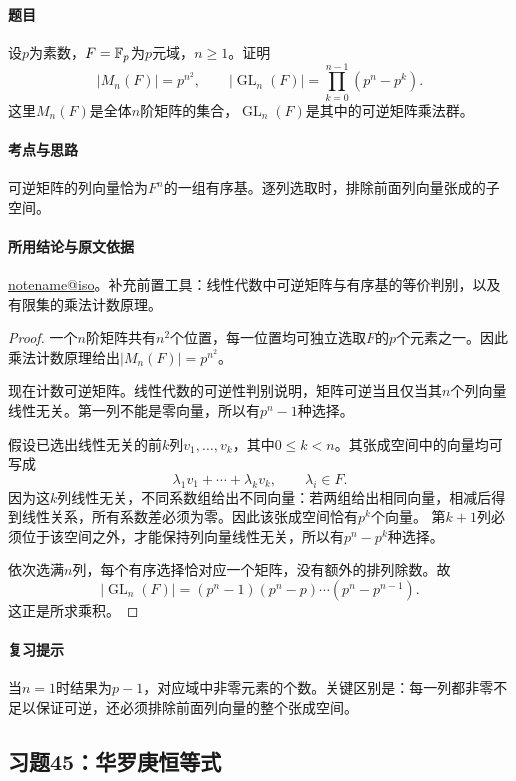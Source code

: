 \documentclass[UTF8,a4paper,11pt,fontset=windows]{ctexart}
\makeatletter
\DeclareMathOperator{\GL}{GL}\DeclareMathOperator{\SL}{SL}
\newcommand{\noteref}[1]{\hyperref[note:#1]{\csname notename@#1\endcsname}}
\newcommand{\exref}[2]{\hyperref[ex:#1:#2]{第#1章习题#2}}
\makeatother
\begin{document}
\paragraph{题目}
设$p$为素数，$F=\mathbb F_p$为$p$元域，$n\geq1$。证明
\[
|M_n(F)|=p^{n^2},\qquad
|\GL_n(F)|=\prod_{k=0}^{n-1}(p^n-p^k).
\]
这里$M_n(F)$是全体$n$阶矩阵的集合，$\GL_n(F)$是其中的可逆矩阵乘法群。

\paragraph{考点与思路}
可逆矩阵的列向量恰为$F^n$的一组有序基。逐列选取时，排除前面列向量张成的子空间。

\paragraph{所用结论与原文依据}
\noteref{iso}。补充前置工具：线性代数中可逆矩阵与有序基的等价判别，以及有限集的乘法计数原理。


\begin{proof}
一个$n$阶矩阵共有$n^2$个位置，每一位置均可独立选取$F$的$p$个元素之一。因此乘法计数原理给出$|M_n(F)|=p^{n^2}$。

现在计数可逆矩阵。线性代数的可逆性判别说明，矩阵可逆当且仅当其$n$个列向量线性无关。第一列不能是零向量，所以有$p^n-1$种选择。

假设已选出线性无关的前$k$列$v_1,\ldots,v_k$，其中$0\leq k<n$。其张成空间中的向量均可写成
\[
\lambda_1v_1+\cdots+\lambda_kv_k,\qquad \lambda_i\in F.
\]
因为这$k$列线性无关，不同系数组给出不同向量：若两组给出相同向量，相减后得到线性关系，所有系数差必须为零。因此该张成空间恰有$p^k$个向量。
第$k+1$列必须位于该空间之外，才能保持列向量线性无关，所以有$p^n-p^k$种选择。

依次选满$n$列，每个有序选择恰对应一个矩阵，没有额外的排列除数。故
\[
|\GL_n(F)|=(p^n-1)(p^n-p)\cdots(p^n-p^{n-1}).
\]
这正是所求乘积。
\end{proof}

\paragraph{复习提示}
当$n=1$时结果为$p-1$，对应域中非零元素的个数。关键区别是：每一列都非零不足以保证可逆，还必须排除前面列向量的整个张成空间。


\subsection{习题45：\texorpdfstring{华罗庚恒等式}{华罗庚恒等式}}
\label{ex:1:45}
\end{document}
